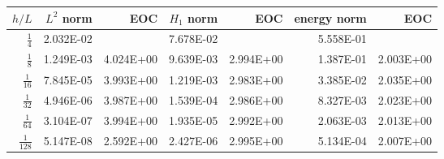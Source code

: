 \begin{table}
  \begin{tabular}{rrrrrrr}
    \hline\hline
    \textbf{$h/{L} $} & \textbf{$L^2$ norm} & \textbf{EOC} & \textbf{$H_1$ norm} & \textbf{EOC} & \textbf{energy norm} & \textbf{EOC} \\\hline
    $\frac{1}{4}$ & 2.032E-02 &  & 7.678E-02 &  & 5.558E-01 &  \\
    $\frac{1}{8}$ & 1.249E-03 & 4.024E+00 & 9.639E-03 & 2.994E+00 & 1.387E-01 & 2.003E+00 \\
    $\frac{1}{16}$ & 7.845E-05 & 3.993E+00 & 1.219E-03 & 2.983E+00 & 3.385E-02 & 2.035E+00 \\
    $\frac{1}{32}$ & 4.946E-06 & 3.987E+00 & 1.539E-04 & 2.986E+00 & 8.327E-03 & 2.023E+00 \\
    $\frac{1}{64}$ & 3.104E-07 & 3.994E+00 & 1.935E-05 & 2.992E+00 & 2.063E-03 & 2.013E+00 \\
    $\frac{1}{128}$ & 5.147E-08 & 2.592E+00 & 2.427E-06 & 2.995E+00 & 5.134E-04 & 2.007E+00 \\\hline\hline
  \end{tabular}
\end{table}
